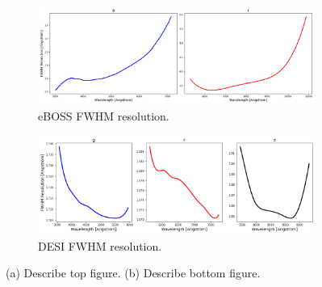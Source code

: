 \begin{figure}[h]
\centering
\begin{subfigure}[b]{0.55\textwidth}
   \includegraphics[width=14cm]{images/specsim/eboss_resolution.png}
   \caption{eBOSS FWHM resolution.}
   \label{fig:eboss_fwhm} 
\end{subfigure}

\begin{subfigure}[b]{0.55\textwidth}
   \includegraphics[width=14cm]{images/specsim/desi_resolution.png}
   \caption{DESI FWHM resolution.}
   \label{fig:desi_fwhm}
\end{subfigure}
\caption[Two numerical solutions]{(a) Describe top figure. (b) Describe bottom figure.}
\end{figure}

